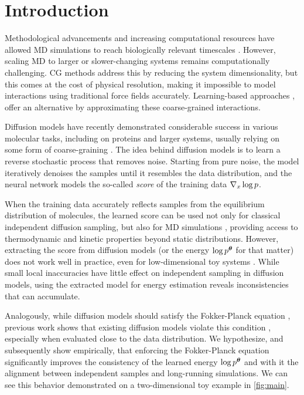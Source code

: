 \section{Introduction}
Methodological advancements and increasing computational resources have allowed \gls{MD} simulations to reach biologically relevant timescales \citep{deshaw20211fastfolding, wolf2020}. However, scaling \gls{MD} to larger or slower-changing systems remains computationally challenging. \Gls{CG} methods address this by reducing the system dimensionality, but this comes at the cost of physical resolution, making it impossible to model interactions using traditional force fields accurately. Learning-based approaches \citep{clementi2008coarse,noid2013perspective,husic2020coarse, charron2023navigating}, offer an alternative by approximating these coarse-grained interactions.

Diffusion models \citep{ho2020diffusion, song2021} have recently demonstrated considerable success in various molecular tasks, including on proteins and larger systems, usually relying on some form of coarse-graining \citep{abramson2024alphafold3, watson2023rfdiffusion, corso2023diffdock, plainer2023diffdockpocket, lewis2024scalable}. The idea behind diffusion models is to learn a reverse stochastic process that removes noise. Starting from pure noise, the model iteratively denoises the samples until it resembles the data distribution, and the neural network models the so-called \emph{score} of the training data $\nabla_x \log p$.

When the training data accurately reflects samples from the equilibrium distribution of molecules, the learned score can be used not only for classical independent diffusion sampling, but also for \gls{MD} simulations \citep{arts2023}, providing access to thermodynamic and kinetic properties beyond static distributions. However, extracting the score from diffusion models (or the energy $\log p^{\bm{\theta}}$ for that matter) does not work well in practice, even for low-dimensional toy systems \citep{koehler2023statistical, li2023generalization}. While small local inaccuracies have little effect on independent sampling in diffusion models, using the extracted model for energy estimation reveals inconsistencies that can accumulate. 

Analogously, while diffusion models should satisfy the Fokker-Planck equation \citep{saarka2019}, previous work shows that existing diffusion models violate this condition \citep{lai2023}, especially when evaluated close to the data distribution. We hypothesize, and subsequently show empirically, that enforcing the Fokker-Planck equation significantly improves the consistency of the learned energy $\log p^{\bm{\theta}}$ and with it the alignment between independent samples and long-running simulations. We can see this behavior demonstrated on a two-dimensional toy example in \cref{fig:main}.

